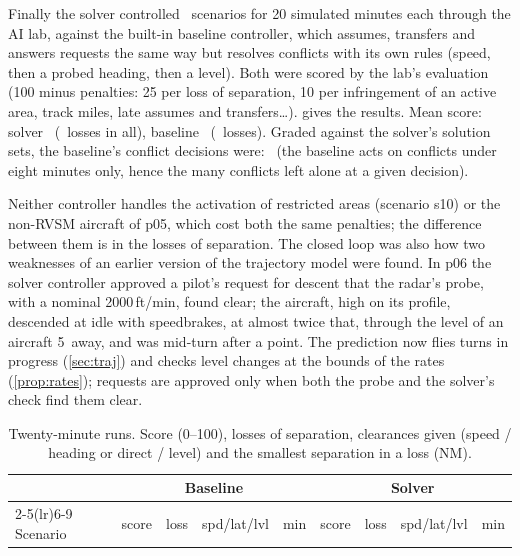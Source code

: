 Finally the solver controlled \clN\ scenarios for 20 simulated minutes each through the AI lab, against the
built-in baseline controller, which assumes, transfers and answers requests the same way but resolves conflicts with
its own rules (speed, then a probed heading, then a level). Both were scored by the lab's evaluation (100 minus
penalties: 25 per loss of separation, 10 per infringement of an active area, track miles, late assumes and
transfers\dots).  gives the results. Mean score: solver \clSolverMean\ (\clSolverLoss\ losses in
all), baseline \clBaselineMean\ (\clBaselineLoss\ losses). Graded against the solver's solution sets, the baseline's
conflict decisions were: \clBaseGrades\ (the baseline acts on conflicts under eight minutes only, hence the many
conflicts left alone at a given decision).

Neither controller handles the activation of restricted areas (scenario s10) or the non-RVSM aircraft of p05, which
cost both the same penalties; the difference between them is in the losses of separation. The closed loop was also
how two weaknesses of an earlier version of the trajectory model were found. In p06 the solver controller approved a
pilot's request for descent that the radar's probe, with a nominal 2000\,ft/min, found clear; the aircraft, high on
its profile, descended at idle with speedbrakes, at almost twice that, through the level of an aircraft 5\NM\ away,
and was mid-turn after a point. The prediction now flies turns in progress (\cref{sec:traj}) and checks level changes
at the bounds of the rates (\cref{prop:rates}); requests are approved only when both the probe and the solver's check
find them clear.

\begin{table}[t]
\centering\small
\caption{Twenty-minute runs. Score (0--100), losses of separation, clearances given (speed / heading or direct /
level) and the smallest separation in a loss (NM).}
\label{tab:runs}
\setlength{\tabcolsep}{4pt}
\begin{tabular}{l rrcr rrcr}
\toprule
& \multicolumn{4}{c}{Baseline} & \multicolumn{4}{c}{Solver}\\
\cmidrule(lr){2-5}\cmidrule(lr){6-9}
Scenario & score & loss & spd/lat/lvl & min & score & loss & spd/lat/lvl & min\\
\midrule

\end{tabular}
\end{table}
